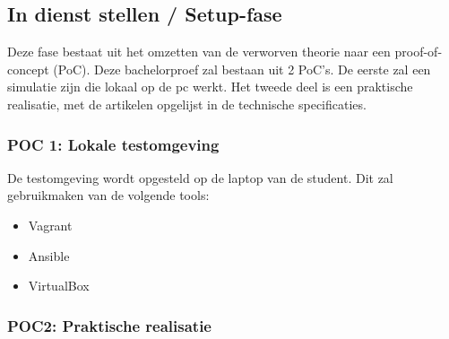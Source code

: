 
\subsection{In dienst stellen / Setup-fase}
Deze fase bestaat uit het omzetten van de verworven theorie naar een proof-of-concept (PoC). Deze bachelorproef zal bestaan uit 2 PoC's. De eerste zal een simulatie zijn die lokaal op de pc werkt. Het tweede deel is een praktische realisatie, met de artikelen opgelijst in de technische specificaties.

\subsubsection{POC 1: Lokale testomgeving}
De testomgeving wordt opgesteld op de laptop van de student. Dit zal gebruikmaken van de volgende tools:

\begin{itemize}
  \item Vagrant
  \item Ansible
  \item VirtualBox
\end{itemize}

\subsubsection{POC2: Praktische realisatie}

